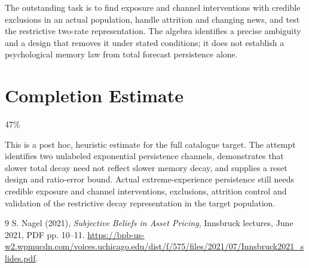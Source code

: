 \documentclass[11pt]{article}
\theoremstyle{definition}
\begin{document}
The outstanding task is to find exposure and channel interventions with
credible exclusions in an actual population, handle attrition and changing
news, and test the restrictive two-rate representation. The algebra
identifies a precise ambiguity and a design that removes it under stated
conditions; it does not establish a psychological memory law from total
forecast persistence alone.

\section{Completion Estimate}
47\%

This is a post hoc, heuristic estimate for the full catalogue target.
The attempt identifies two unlabeled exponential persistence channels, demonstrates that slower total decay need not reflect slower memory decay, and supplies a reset design and ratio-error bound. Actual extreme-experience persistence still needs credible exposure and channel interventions, exclusions, attrition control and validation of the restrictive decay representation in the target population.

\begin{thebibliography}{9}
 S. Nagel (2021), \emph{Subjective Beliefs in Asset Pricing},
Innsbruck lectures, June 2021, PDF pp. 10--11.
\url{https://bpb-us-w2.wpmucdn.com/voices.uchicago.edu/dist/f/575/files/2021/07/Innsbruck2021_slides.pdf}.
\end{thebibliography}
\end{document}
